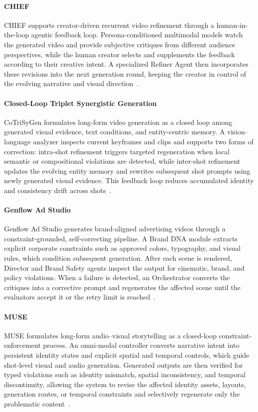 \paragraph{CHIEF}
CHIEF supports creator-driven recurrent video refinement through a human-in-the-loop agentic feedback loop. Persona-conditioned multimodal models watch the generated video and provide subjective critiques from different audience perspectives, while the human creator selects and supplements the feedback according to their creative intent. A specialized Refiner Agent then incorporates these revisions into the next generation round, keeping the creator in control of the evolving narrative and visual direction~\cite{avg260618591}.

\paragraph{Closed-Loop Triplet Synergistic Generation}
CoTriSyGen formulates long-form video generation as a closed loop among generated visual evidence, text conditions, and entity-centric memory. A vision--language analyzer inspects current keyframes and clips and supports two forms of correction: intra-shot refinement triggers targeted regeneration when local semantic or compositional violations are detected, while inter-shot refinement updates the evolving entity memory and rewrites subsequent shot prompts using newly generated visual evidence. This feedback loop reduces accumulated identity and consistency drift across shots~\cite{avg260616184}.

\paragraph{Genflow Ad Studio}
Genflow Ad Studio generates brand-aligned advertising videos through a constraint-grounded, self-correcting pipeline. A Brand DNA module extracts explicit corporate constraints such as approved colors, typography, and visual rules, which condition subsequent generation. After each scene is rendered, Director and Brand Safety agents inspect the output for cinematic, brand, and policy violations. When a failure is detected, an Orchestrator converts the critiques into a corrective prompt and regenerates the affected scene until the evaluators accept it or the retry limit is reached~\cite{avg260516748}.

\paragraph{MUSE}
MUSE formulates long-form audio--visual storytelling as a closed-loop constraint-enforcement process. An omni-modal controller converts narrative intent into persistent identity states and explicit spatial and temporal controls, which guide shot-level visual and audio generation. Generated outputs are then verified for typed violations such as identity mismatch, spatial inconsistency, and temporal discontinuity, allowing the system to revise the affected identity assets, layouts, generation routes, or temporal constraints and selectively regenerate only the problematic content~\cite{avg260203028}.

